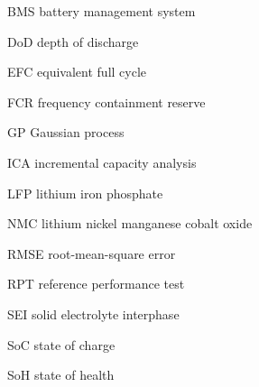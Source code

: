 
\begin{abbreviations}
  \item[BMS]  battery management system
  \item[DoD]  depth of discharge
  \item[EFC]  equivalent full cycle
  \item[FCR]  frequency containment reserve
  \item[GP]   Gaussian process
  \item[ICA]  incremental capacity analysis
  \item[LFP]  lithium iron phosphate
  \item[NMC]  lithium nickel manganese cobalt oxide
  \item[RMSE] root-mean-square error
  \item[RPT]  reference performance test
  \item[SEI]  solid electrolyte interphase
  \item[SoC]  state of charge
  \item[SoH]  state of health
\end{abbreviations}
